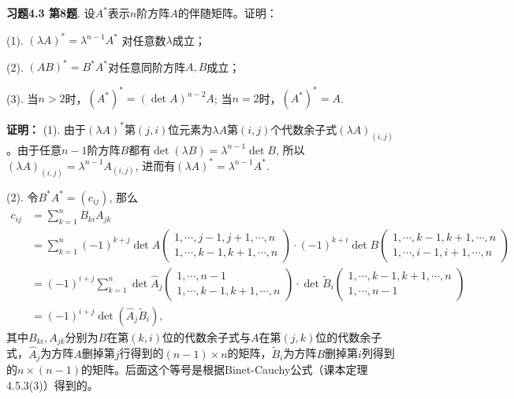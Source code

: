 
\renewcommand{\newpageorvspace}{\vspace{2em}}

\date{2021-11-26  第五次习题课}



\maketitle

{\bf 习题4.3 第8题}. 设$A^*$表示$n$阶方阵$A$的伴随矩阵。证明：

(1). $(\lambda A)^* = \lambda^{n-1}A^*$ 对任意数$\lambda$成立；

(2). $(AB)^* = B^*A^*$对任意同阶方阵$A,B$成立；

(3). 当$n > 2$时，$(A^*)^* = (\det A)^{n-2}A$; 当$n = 2$时，$(A^*)^* = A$.

{\bf 证明：} (1). 由于$(\lambda A)^*$第$(j,i)$位元素为$\lambda A$第$(i,j)$个代数余子式$(\lambda A)_{(i,j)}$。由于任意$n-1$阶方阵$B$都有$\det(\lambda B) = \lambda^{n-1}\det B$, 所以$(\lambda A)_{(i,j)} = \lambda^{n-1} A_{(i,j)}$, 进而有$(\lambda A)^* = \lambda^{n-1}A^*$.

(2). 令$B^*A^* = (c_{ij})$, 那么
\begin{align*}
c_{ij} & = \sum\limits_{k=1}^n B_{ki} A_{jk} \\
& = \sum\limits_{k=1}^n (-1)^{k+j}\det A\begin{pmatrix} 1,\cdots,j-1,j+1,\cdots,n \\ 1,\cdots,k-1,k+1,\cdots,n \end{pmatrix} \cdot (-1)^{k+i} \det B\begin{pmatrix} 1,\cdots,k-1,k+1,\cdots,n \\ 1,\cdots,i-1,i+1,\cdots,n \end{pmatrix} \\
& = (-1)^{i+j} \sum\limits_{k=1}^n \det\widehat{A}_j\begin{pmatrix} 1,\cdots,n-1 \\ 1,\cdots,k-1,k+1,\cdots,n \end{pmatrix} \cdot \det \widetilde{B}_i\begin{pmatrix} 1,\cdots,k-1,k+1,\cdots,n \\ 1,\cdots,n-1 \end{pmatrix} \\
& = (-1)^{i+j} \det(\widehat{A}_j \widetilde{B}_i),
\end{align*}
其中$B_{ki}, A_{jk}$分别为$B$在第$(k,i)$位的代数余子式与$A$在第$(j,k)$位的代数余子式，$\widehat{A}_j$为方阵$A$删掉第$j$行得到的$(n-1)\times n$的矩阵，$\widetilde{B}_i$为方阵$B$删掉第$i$列得到的$n\times (n-1)$的矩阵。后面这个等号是根据Binet-Cauchy公式（课本定理4.5.3(3)）得到的。

